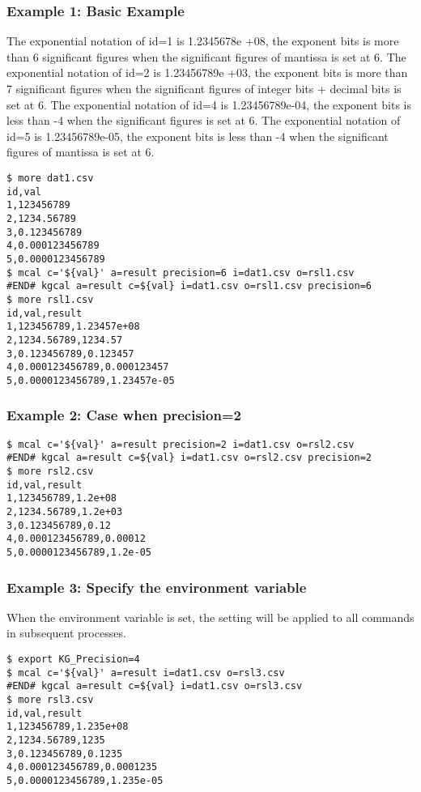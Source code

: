 \subsubsection*{Example 1: Basic Example}

The exponential notation of id=1 is 1.2345678e +08, the exponent bits is more than 6 significant figures when the significant figures of mantissa is set at 6.   
The exponential notation of id=2 is 1.23456789e +03, the exponent bits is more than 7 significant figures when the significant figures of integer bits + decimal bits is set at 6. 
The exponential notation of id=4 is 1.23456789e-04, the exponent bits is less than -4 when the significant figures is set at 6. 
The exponential notation of id=5 is 1.23456789e-05, the exponent bits is less than -4 when the significant figures of mantissa is set at 6. 


\begin{Verbatim}[baselinestretch=0.7,frame=single]
$ more dat1.csv
id,val
1,123456789
2,1234.56789
3,0.123456789
4,0.000123456789
5,0.0000123456789
$ mcal c='${val}' a=result precision=6 i=dat1.csv o=rsl1.csv
#END# kgcal a=result c=${val} i=dat1.csv o=rsl1.csv precision=6
$ more rsl1.csv
id,val,result
1,123456789,1.23457e+08
2,1234.56789,1234.57
3,0.123456789,0.123457
4,0.000123456789,0.000123457
5,0.0000123456789,1.23457e-05
\end{Verbatim}
\subsubsection*{Example 2: Case when precision=2}



\begin{Verbatim}[baselinestretch=0.7,frame=single]
$ mcal c='${val}' a=result precision=2 i=dat1.csv o=rsl2.csv
#END# kgcal a=result c=${val} i=dat1.csv o=rsl2.csv precision=2
$ more rsl2.csv
id,val,result
1,123456789,1.2e+08
2,1234.56789,1.2e+03
3,0.123456789,0.12
4,0.000123456789,0.00012
5,0.0000123456789,1.2e-05
\end{Verbatim}
\subsubsection*{Example 3: Specify the environment variable}

When the environment variable is set, the setting will be applied to all commands in subsequent processes.


\begin{Verbatim}[baselinestretch=0.7,frame=single]
$ export KG_Precision=4
$ mcal c='${val}' a=result i=dat1.csv o=rsl3.csv
#END# kgcal a=result c=${val} i=dat1.csv o=rsl3.csv
$ more rsl3.csv
id,val,result
1,123456789,1.235e+08
2,1234.56789,1235
3,0.123456789,0.1235
4,0.000123456789,0.0001235
5,0.0000123456789,1.235e-05
\end{Verbatim}
